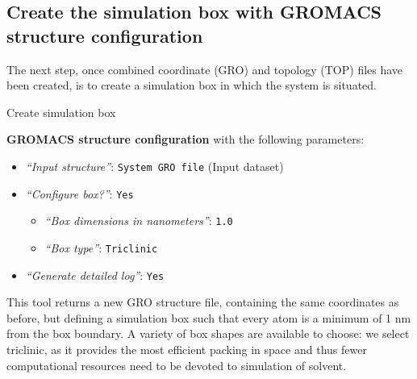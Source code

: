 \documentclass[twocolumn]{bmcart}%
\providecommand{\tightlist}{%
  \setlength{\itemsep}{0pt}\setlength{\parskip}{0pt}}
\begin{document}
\subsection*{\texorpdfstring{Create the simulation box with
\textbf{GROMACS structure
configuration}}{Create the simulation box with GROMACS structure configuration}}\label{create-the-simulation-box-with-gromacs-structure-configuration}

The next step, once combined coordinate (GRO) and topology (TOP) files
have been created, is to create a simulation box in which the system is
situated.

\begin{handson_box_colour}{Create simulation box}


  \textbf{GROMACS structure configuration} with the following
  parameters:

  \begin{itemize}
  \item
    \emph{``Input structure''}: \texttt{System\ GRO\ file} (Input
    dataset)
  \item
    \emph{``Configure box?''}: \texttt{Yes}

    \begin{itemize}
    \item
      \emph{``Box dimensions in nanometers''}: \texttt{1.0}
    \item
      \emph{``Box type''}: \texttt{Triclinic}
    \end{itemize}
  \item
    \emph{``Generate detailed log''}: \texttt{Yes}
  \end{itemize}

\end{handson_box_colour}

This tool returns a new GRO structure file, containing the same coordinates as before, but defining a simulation box such that every atom is a minimum of 1 nm from the box boundary. A variety of box shapes are available to choose: we select triclinic, as it provides the most efficient packing in space and thus fewer computational resources need to be devoted to simulation of solvent. 
\end{document}
